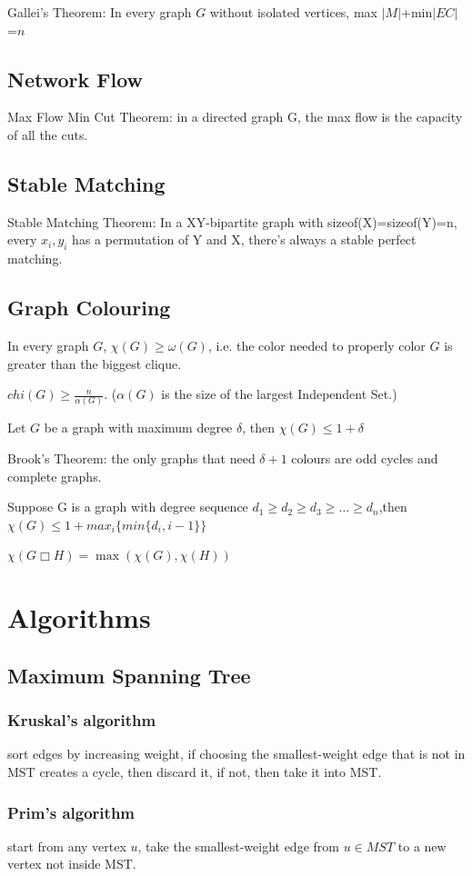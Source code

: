 \documentclass[12pt,a4paper]{ctexrep}
\begin{document}
Gallei's Theorem: In every graph $G$ without isolated vertices, max $|M|$+min$|EC|$=$n$
\subsection{Network Flow}
Max Flow Min Cut Theorem: in a directed graph G, the max flow is the capacity of all the cuts.
\subsection{Stable Matching}
Stable Matching Theorem: In a XY-bipartite graph with sizeof(X)=sizeof(Y)=n, every $x_{i},y_{i}$ has a permutation of Y and X, there's always a stable perfect matching.
\subsection{Graph Colouring}
In every graph $G$, $\chi(G) \geq \omega(G)$, i.e. the color needed to properly color $G$ is greater than the biggest clique.

$chi(G)\geq \frac{n}{\alpha(G)}$. ($\alpha(G)$ is the size of the largest Independent Set.)

Let $G$ be a graph with maximum degree $\delta$, then $\chi(G) \leq 1+\delta$

Brook's Theorem: the only graphs that need $\delta +1$ colours are odd cycles and complete graphs.\

Suppose G is a graph with degree sequence $d_{1}\geq d_{2} \geq d_{3} \geq \dots \geq d_{n}$,then $\chi(G) \leq 1+max_{i}\{min\{d_{i},i-1\}\}$

$\chi(G\Box H)=\max(\chi(G),\chi(H))$
\section{Algorithms}
\subsection{Maximum Spanning Tree}
\subsubsection{Kruskal's algorithm}
sort edges by increasing weight, if choosing the smallest-weight edge that is not in MST creates a cycle, then discard it, if not, then take it into MST.
\subsubsection{Prim's algorithm}
start from any vertex $u$, take the smallest-weight edge from $u \in MST$ to a new vertex not inside MST.
\end{document}
